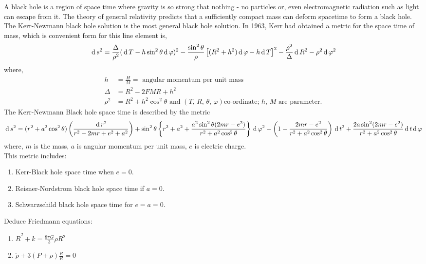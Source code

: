 \documentclass[../main-sheet.tex]{subfiles}
\begin{document}
\begin{soln}
    A black hole is a region of space time where gravity is so strong that nothing - no particles or, even electromagnetic radiation such as light can escape from it. The theory of general relativity predicts that a sufficiently compact mass can deform spacetime to form a black hole.\\


    The Kerr-Newmann black hole solution is the most general black hole solution. In 1963, Kerr had obtained a metric for the space time of mass, which is convenient form for this line element is,
    \begin{equation}
        \,\mathrm{d}\, s^2=\frac{\Delta }{\rho^2}(\,\mathrm{d}\, T-h\sin^2\theta \,\mathrm{d}\, \varphi)^2-\frac{\sin^2 \theta}{\rho}\left[(R^2+h^2)\,\mathrm{d}\,\varphi-h\,\mathrm{d}\, T\right]^2-\frac{\rho^2}{\Delta}\,\mathrm{d}\, R^2-\rho^2\,\mathrm{d}\, \varphi^2 \label{eq:kerr1}
    \end{equation}
    where,
    \begin{align*}
        h&=\frac{H }{M }=\text{ angular momentum per unit mass}\\
        \Delta&=R^2-2FMR+h^2\\
        \rho^2&=R^2+h^2\cos^2\theta\text{ and } (T,\,R,\,\theta,\,\varphi) \text{
        co-ordinate; \(h\), \(M\) are parameter.}
    \end{align*} 
The Kerr-Newmann Black hole space time is described by the metric
\[
    \,\mathrm{d}\, s^2=(r^2+a^2\cos^2\theta)\left(\frac{\,\mathrm{d}\, r^2 }{r^2-2mr+e^2+a^2}\right)+\sin^2 \theta\left\{r^2+a^2+\frac{a^2 \sin^2 \theta(2mr-e^2)}{r^2+a^2\cos^2\theta}\right\}\,\mathrm{d}\, \varphi^2-\left(1-\frac{2mr-e^2}{r^2+a^2\cos^2\theta}\right)\,\mathrm{d}\, t^2+\frac{2a\sin^2(2mr-e^2)}{r^2+a^2\cos^2\theta}\,\mathrm{d}\, t\,\mathrm{d}\, \varphi
\]
where, \(m\) is the mass,
\(a\) is angular momentum per unit mass, \(e\) is electric charge.\\



This metric includes:
\begin{enumerate}[label=(\roman*)]
    \item Kerr-Black hole space time when \(e = 0\).
    \item Reisner-Nordstrom black hole space time if \(a = 0\).
    \item Schwarzschild black hole space time for \(e = a = 0\).
\end{enumerate}
\end{soln}
\begin{prob}
    Deduce Friedmann equations:
    \begin{enumerate}[label=(\roman*)]
        \item \(\displaystyle\dot{R}^2+k=\frac{8\pi G }{3}\rho R^2\)
        \item \(\displaystyle\dot{\rho}+3(P+\rho)\frac{\dot{R}}{R }=0\)
    \end{enumerate}
\end{prob}
\end{document}

